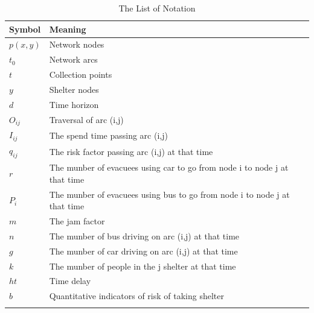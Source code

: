\documentclass{mcmthesis}
\numberwithin{figure}{section}
\numberwithin{table}{section}
\begin{document}
\begin{center}
\begin{longtable}{p{}p{}m{}}
\caption{The List of Notation}\\
\hline
Symbol& Meaning \\
\hline

$p(x,y)$      & Network nodes
                                                         \\
$t_0$      & Network arcs
                                                          \\
$t$     & Collection points
                                                        \\
$y$       & Shelter nodes                                                            \\
$d$      & Time horizon                                                            \\
$O_{ij}$       & Traversal of arc (i,j)                                  \\
$I_{ij}$       & The spend time passing arc (i,j)                                         \\
$q_{ij}$       & The risk factor passing arc (i,j) at that time                            \\
$r$       & The munber of evacuees using car to go from node i to node j at that time \\
$P_i$       & The munber of evacuees using bus to go from node i to node j at that time \\
$m$      & The jam factor                                                            \\
$n$       & The munber of bus driving on arc (i,j) at that time                      \\
$g$       & The munber of car driving on arc (i,j) at that time                      \\
$k$       & The munber of people in the j shelter at that time                       \\
$ht$       & Time delay                                                                \\
$b$       & Quantitative indicators of risk of taking shelter                         \\
                                                        \\ \hline

 \end{longtable}
 \end{center}
\end{document}
